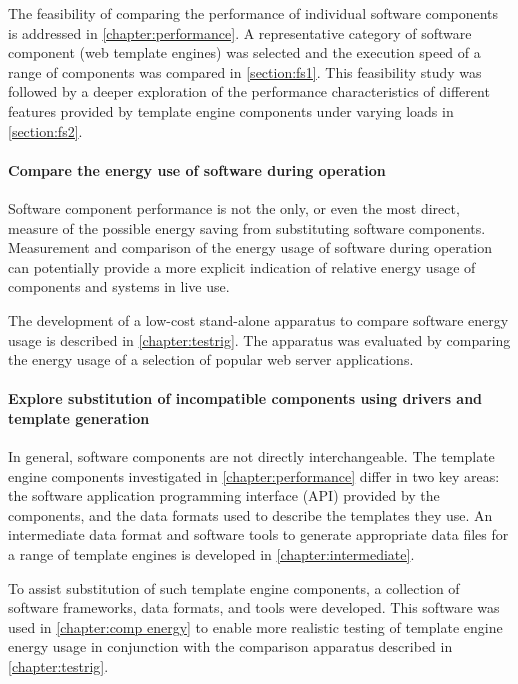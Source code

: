 The feasibility of comparing the performance of individual software components is addressed in \autoref{chapter:performance}. A representative category of software component (web template engines) was selected and the execution speed of a range of components was compared in \autoref{section:fs1}. This feasibility study was followed by a deeper exploration of the performance characteristics of different features provided by template engine components under varying loads in \autoref{section:fs2}.

\paragraph{Compare the energy use of software during operation}

Software component performance is not the only, or even the most direct, measure of the possible energy saving from substituting software components. Measurement and comparison of the energy usage of software during operation can potentially provide a more explicit indication of relative energy usage of components and systems in live use.

The development of a low-cost stand-alone apparatus to compare software energy usage is described in \autoref{chapter:testrig}. The apparatus was evaluated by comparing the energy usage of a selection of popular web server applications.

\paragraph{Explore substitution of incompatible components using drivers and template generation}

In general, software components are not directly interchangeable. The template engine components investigated in \autoref{chapter:performance} differ in two key areas: the software application programming interface (API) provided by the components, and the data formats used to describe the templates they use. An intermediate data format and software tools to generate appropriate data files for a range of template engines is developed in \autoref{chapter:intermediate}.

To assist substitution of such template engine components, a collection of software frameworks, data formats, and tools were developed. This software was used in \autoref{chapter:comp energy} to enable more realistic testing of template engine energy usage in conjunction with the comparison apparatus described in \autoref{chapter:testrig}.
